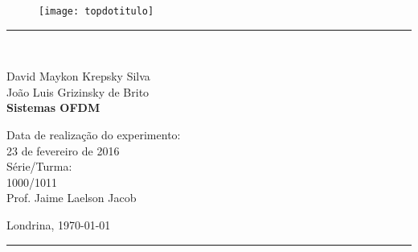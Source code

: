 \begin{titlepage}
\begin{center}
\begin{figure}[h]
\texttt{[image: topdotitulo]}
\end{figure}
\rule{\columnwidth}{1.5mm}
\

\large David Maykon Krepsky Silva \\
\large João Luis Grizinsky de Brito \\

\vspace{4cm}
{\bf \Large Sistemas OFDM}
\vspace{3.5cm}

\begin{flushright}
Data de realização do experimento:\\
23 de fevereiro de 2016\\
Série/Turma:\\
1000/1011\\
Prof. Jaime Laelson Jacob
\end{flushright}

\vspace{3.2cm}
Londrina, \today

\rule{\columnwidth}{1.3mm}
\end{center}
\end{titlepage}